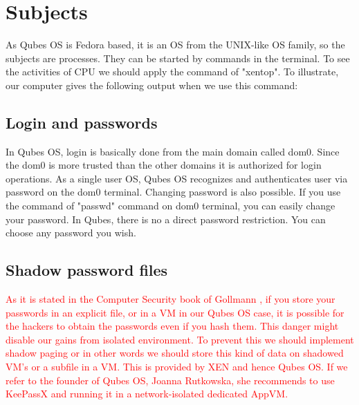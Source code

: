 \documentclass[runningheads,a4paper]{article}
\begin{document}
\section{Subjects}

As Qubes OS is Fedora based, it is an OS from the UNIX-like OS family,
so the
subjects are processes. They can be started by commands in the
terminal. To see the activities of CPU we should apply the command of
"xentop". To illustrate, our computer gives the following output when
we use this command:

\subsection{Login and passwords} 

In Qubes OS, login is basically done
from the main domain called dom0.  Since the dom0 is more trusted than
the other domains it is authorized for login operations.  As a single
user OS, Qubes OS recognizes and authenticates user via password on
the dom0 terminal.  Changing password is also possible.  If you use
the command of "passwd" command on dom0 terminal, you can easily
change your password.  In Qubes, there is no a direct password
restriction.  You can choose any password you wish.

\subsection{Shadow password files} 
\textcolor{red}{
As it is stated in the Computer Security book of Gollmann
\cite{GollmannComputerSecurity}, if you store your passwords in an
explicit file, or in a VM in our Qubes OS case, it is possible for the
hackers to obtain the passwords even if you hash them.  
This danger might disable our gains from
isolated environment. To prevent this we should implement shadow
paging or in other words we should store this kind of data on shadowed
VM's or a subfile in a VM. This is provided by XEN and hence Qubes
OS. If we refer to the founder of Qubes OS, Joanna Rutkowska, she
recommends to use KeePassX and running it in a network-isolated
dedicated AppVM.}  
\end{document}
